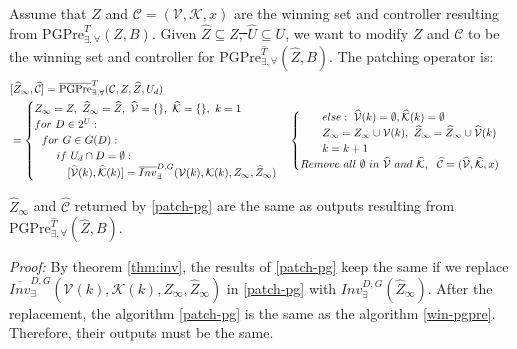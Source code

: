 Assume that $ Z $ and $ \mathcal{C} = (\mathcal{V},\mathcal{K},x) $ are the winning set and controller resulting from  $ \text{PGPre}_{\exists,\forall}^{T} (Z,B)$. Given $ \widehat{Z}\subseteq Z ${\color{teal}\sout{,  $ \widehat{U}\subseteq U $}}, we want to modify $ Z $ and $ \mathcal{C} $ to be the winning set and controller for $ \text{PGPre}_{\exists, \forall}^{\widehat{T}}(\widehat{Z},B)$. The patching operator is:
{\small\begin{align}
\begin{split}
&[\widehat{Z}_{\infty},\widehat{\mathcal{C}}]=\overline{\text{PGPre}}_{\exists,\forall}^{T} (\mathcal{C},Z,\widehat{Z},U_d)\\
&= \begin{cases}
Z_{\infty} = Z,\ \widehat{Z}_{\infty}=\widehat{Z},\ \widehat{\mathcal{V}}=\{\},\ \widehat{\mathcal{K}}=\{\},\ k = 1\\
for\ D\in 2^U:\\
\ \ for\ G\in G(D):\\
\ \ \ \ \ \ if\ U_d\cap D = \emptyset:\\
\ \ \ \ \ \ \ \ \  [\widehat{\mathcal{V}}(k),\widehat{\mathcal{K}}(k)]=\overline{Inv}_{\exists}^{D,G}(\mathcal{V}(k),\mathcal{K}(k),Z_\infty, \widehat{Z}_\infty)\\
\end{cases}
\begin{cases}
\ \ \ \ \ \ else:\ \widehat{\mathcal{V}}(k)=\emptyset, \widehat{\mathcal{K}}(k) = \emptyset\\
\ \ \ \ \ \  Z_\infty = Z_\infty\cup \mathcal{V}(k),\ \widehat{Z}_{\infty} = \widehat{Z}_{\infty} \cup \widehat{\mathcal{V}}(k)\\
\ \ \ \ \ \ {\color{black} k = k+1}\\
Remove\ all\ \emptyset\ in\ \widehat{\mathcal{V}}\ and \ \widehat{\mathcal{K}},\ \ 
\widehat{\mathcal{C}} = (\widehat{\mathcal{V}},\widehat{\mathcal{K}},x)
\end{cases}\label{patch-pg}
\end{split}
\end{align}}

\begin{theorem}
	$ \widehat{Z}_\infty $ and $ \widehat{\mathcal{C}} $ returned by \eqref{patch-pg} are the same as outputs resulting from $ \text{PGPre}_{\exists, \forall}^{\widehat{T}}(\widehat{Z},B)$.	\label{thm:pg}
\end{theorem}

\emph{Proof:} By theorem \ref{thm:inv}, the results of \eqref{patch-pg} keep the same if we replace $ \overline{Inv}_{\exists}^{D,G}(\mathcal{V}(k),\mathcal{K}(k),Z_\infty, \widehat{Z}_\infty)$ in \eqref{patch-pg} with $ Inv_\exists^{D,G}(\widehat{Z}_{\infty}) $. After the replacement, the algorithm \eqref{patch-pg} is the same as the algorithm \eqref{win-pgpre}. Therefore, their outputs must be the same. \QEDB


